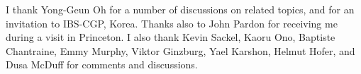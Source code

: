 I thank Yong-Geun Oh for a number of discussions 
on related topics, and for an invitation to 
IBS-CGP, Korea. Thanks also to John Pardon for 
receiving me during a visit in Princeton. I also 
thank Kevin Sackel, Kaoru Ono, Baptiste Chantraine, Emmy Murphy, Viktor Ginzburg, Yael Karshon, Helmut Hofer, 
and Dusa McDuff for comments and discussions. 
